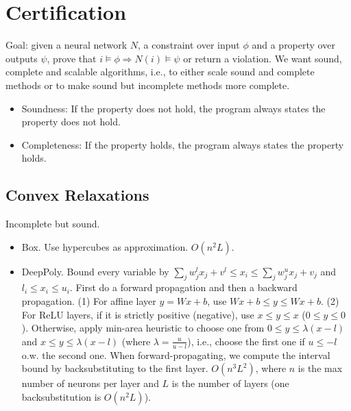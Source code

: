 \section{Certification}
Goal: given a neural network $N$, a constraint over input $\phi$ and a property over outputs $\psi$, prove that $i \vDash \phi \Rightarrow N(i) \vDash \psi$ or return a violation. We want sound, complete and scalable algorithms, i.e., to either scale sound and complete methods or to make sound but incomplete methods more complete.
\begin{itemize}
    \item Soundness: If the property does not hold, the program always states the property does not hold.
    \item Completeness: If the property holds, the program always states the property holds.
\end{itemize}

\subsection*{Convex Relaxations}
Incomplete but sound.
\begin{itemize}
    \item Box. Use hypercubes as approximation. $O(n^2L)$.
    \item DeepPoly. Bound every variable by $\sum_j w^l_jx_j + v^l \leq x_i \leq \sum_j w^u_j x_j +v_j$ and $l_i \le x_i \le u_i$. First do a forward propagation and then a backward propagation. (1) For affine layer $y=Wx+b$, use $Wx+b\le y\le Wx+b$. (2) For ReLU layers, if it is strictly positive (negative), use $x\le y\le x$ ($0\le y\le 0$). Otherwise, apply min-area heuristic to choose one from $0\le y\le \lambda(x-l)$ and $x\le y \le \lambda(x-l)$ (where $\lambda=\frac{u}{u-l}$), i.e., choose the first one if $u\leq -l$ o.w. the second one. When forward-propagating, we compute the interval bound by backsubstituting to the first layer. $O(n^3L^2)$, where $n$ is the max number of neurons per layer and $L$ is the number of layers (one backsubstitution is $O(n^2L)$).
\end{itemize}


